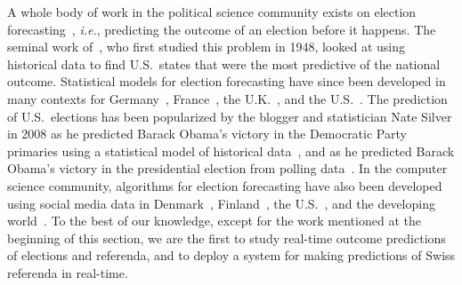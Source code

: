 A whole body of work in the political science community exists on election forecasting~\citep{lewis2005election}, \textit{i.e.}, predicting the outcome of an election before it happens.
The seminal work of~\citet{bean1948predict}, who first studied this problem in 1948, looked at using historical data to find U.S.\ states that were the most predictive of the national outcome.
Statistical models for election forecasting have since been developed in many contexts for Germany~\citep{tumasjan2011election}, France~\citep{belanger2004finding}, the U.K.~\citep{franch2013wisdom}, and the U.S.~\citep{rigdon2009bayesian,kennedy2017improving}.
The prediction of U.S.\ elections has been popularized by the blogger and statistician Nate Silver in 2008 as he predicted Barack Obama's victory in the Democratic Party primaries using a statistical model of historical data~\citep{blumenthal2008poblano}, and as he predicted Barack Obama's victory in the presidential election from polling data~\citep{silver2008pollster}.
In the computer science community, algorithms for election forecasting have also been developed using social media data in Denmark~\citep{kristensen2017parsimonious}, Finland~\citep{vepsalainen2017facebook}, the U.S.~\citep{choy2012us,ramteke2016election}, and the developing world~\citep{dwi2015twitter}.
To the best of our knowledge, except for the work mentioned at the beginning of this section, we are the first to study real-time outcome predictions of elections and referenda, and to deploy a system for making predictions of Swiss referenda in real-time.
